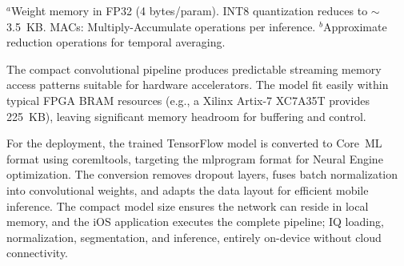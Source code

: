 \documentclass[conference]{IEEEtran}
\begin{document}
\begin{table}[htbp]
\caption{NAS-Generated Architecture with Layer-Level Details}
\begin{center}
\label{tab:architecture}
\end{center}
\vspace{-2mm}
\footnotesize{$^{a}$Weight memory in FP32 (4 bytes/param). INT8 quantization reduces to $\sim$3.5~KB. MACs: Multiply-Accumulate operations per inference. $^{b}$Approximate reduction operations for temporal averaging.}
\end{table}

The compact convolutional pipeline produces predictable streaming memory access patterns suitable for hardware accelerators. The model fit easily within typical FPGA BRAM resources (e.g., a Xilinx Artix-7 XC7A35T provides 225~KB), leaving significant memory headroom for buffering and control.


For the deployment, the trained TensorFlow model \cite{abadi2016tensorflow} is converted to Core~ML format \cite{coreml_guide} using \mbox{coremltools}, targeting the \mbox{mlprogram} format for Neural Engine optimization. The conversion removes dropout layers, fuses batch normalization into convolutional weights, and adapts the data layout for efficient mobile inference. The compact model size ensures the network can reside in local memory, and the iOS application executes the complete pipeline; IQ loading, normalization, segmentation, and inference, entirely on-device without cloud connectivity.
\end{document}
